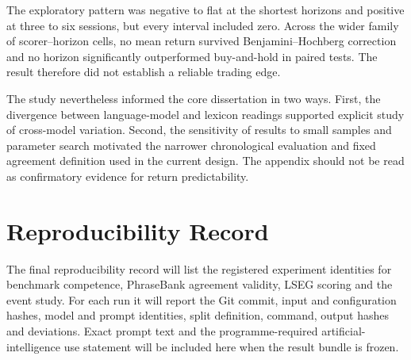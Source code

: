 \documentclass[11pt,a4paper,oneside]{book}
\newif\ifshowdraftnotes
\newcommand{\draftnote}[1]{%
  \ifshowdraftnotes
    \par\smallskip
    \noindent{\color{draftgrey}\small\itshape Drafting note: #1\par}
    \smallskip
  \fi
}
\begin{document}
The exploratory pattern was negative to flat at the shortest horizons and positive at three to six sessions, but every interval included zero.
Across the wider family of scorer--horizon cells, no mean return survived Benjamini--Hochberg correction and no horizon significantly outperformed buy-and-hold in paired tests.
The result therefore did not establish a reliable trading edge.

The study nevertheless informed the core dissertation in two ways.
First, the divergence between language-model and lexicon readings supported explicit study of cross-model variation.
Second, the sensitivity of results to small samples and parameter search motivated the narrower chronological evaluation and fixed agreement definition used in the current design.
The appendix should not be read as confirmatory evidence for return predictability.

\chapter{Reproducibility Record}
\label{app:reproducibility}

The final reproducibility record will list the registered experiment identities for benchmark competence, PhraseBank agreement validity, LSEG scoring and the event study.
For each run it will report the Git commit, input and configuration hashes, model and prompt identities, split definition, command, output hashes and deviations.
Exact prompt text and the programme-required artificial-intelligence use statement will be included here when the result bundle is frozen.

\draftnote{Populate this appendix from the registered manifests. Do not paste proprietary LSEG text or secrets.}

\end{document}

